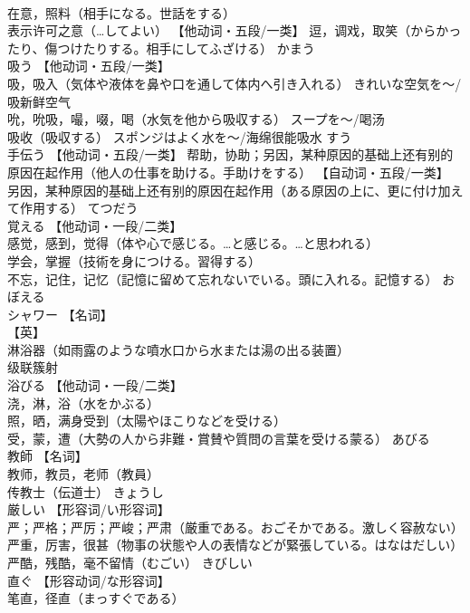 \documentclass[8pt]{extreport}
\begin{document}
\begin{CJK}{UTF8}{min}
\\	在意，照料（相手になる。世話をする） 
\\	表示许可之意（…してよい） 【他动词・五段/一类】 逗，调戏，取笑（からかったり、傷つけたりする。相手にしてふざける）	かまう	
\\	吸う	【他动词・五段/一类】 
\\	吸，吸入（気体や液体を鼻や口を通して体内へ引き入れる） きれいな空気を〜/吸新鲜空气 
\\	吮，吮吸，嘬，啜，喝（水気を他から吸収する） スープを〜/喝汤 
\\	吸收（吸収する） スポンジはよく水を〜/海绵很能吸水	すう	
\\	手伝う	【他动词・五段/一类】 帮助，协助；另因，某种原因的基础上还有别的原因在起作用（他人の仕事を助ける。手助けをする） 【自动词・五段/一类】 另因，某种原因的基础上还有别的原因在起作用（ある原因の上に、更に付け加えて作用する）	てつだう	
\\	覚える	【他动词・一段/二类】 
\\	感觉，感到，觉得（体や心で感じる。…と感じる。…と思われる） 
\\	学会，掌握（技術を身につける。習得する） 
\\	不忘，记住，记忆（記憶に留めて忘れないでいる。頭に入れる。記憶する）	おぼえる	
\\	シャワー	【名词】 
\\	【英】
\\	淋浴器（如雨露のような噴水口から水または湯の出る装置） 
\\	级联簇射		
\\	浴びる	【他动词・一段/二类】 
\\	浇，淋，浴（水をかぶる） 
\\	照，晒，满身受到（太陽やほこりなどを受ける） 
\\	受，蒙，遭（大勢の人から非難・賞賛や質問の言葉を受ける蒙る）	あびる	
\\	教師	【名词】 
\\	教师，教员，老师（教員） 
\\	传教士（伝道士）	きょうし	
\\	厳しい	【形容词/い形容词】 
\\	严；严格；严厉；严峻；严肃（厳重である。おごそかである。激しく容赦ない） 
\\	严重，厉害，很甚（物事の状態や人の表情などが緊張している。はなはだしい） 
\\	严酷，残酷，毫不留情（むごい）	きびしい	
\\	直ぐ	【形容动词/な形容词】 
\\	笔直，径直（まっすぐである） 

\end{CJK}
\end{document}
